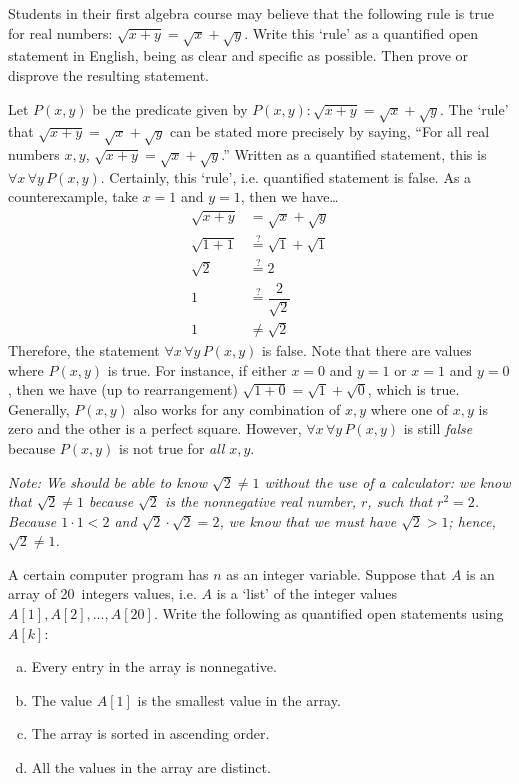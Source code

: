 \documentclass[11pt,letterpaper]{article}
\begin{document}
\newpage



 Students in their first algebra course may believe that the following rule is true for real numbers: $\sqrt{x + y}= \sqrt{x} + \sqrt{y}$. Write this `rule' as a quantified open statement in English, being as clear and specific as possible. Then prove or disprove the resulting statement. \pspace

\sol Let $P(x, y)$ be the predicate given by $P(x, y): \sqrt{x + y}= \sqrt{x} + \sqrt{y}$. The `rule' that $\sqrt{x + y}= \sqrt{x} + \sqrt{y}$ can be stated more precisely by saying, ``For all real numbers $x, y$, $\sqrt{x + y}= \sqrt{x} + \sqrt{y}$.'' Written as a quantified statement, this is $\forall x\, \forall y\, P(x, y)$. Certainly, this `rule', i.e. quantified statement is false. As a counterexample, take $x= 1$ and $y= 1$, then we have\dots
	\[
	\begin{aligned}
	\sqrt{x + y}&= \sqrt{x} + \sqrt{y} \\[0.3cm]
	\sqrt{1 + 1}&\stackrel{?}{=} \sqrt{1} + \sqrt{1} \\[0.3cm]
	\sqrt{2}&\stackrel{?}{=} 2 \\[0.3cm]
	1&\stackrel{?}{=} \dfrac{2}{\sqrt{2}} \\[0.3cm]
	1&\neq \sqrt{2}
	\end{aligned}
	\]
Therefore, the statement $\forall x\, \forall y\, P(x, y)$ is false. Note that there are values where $P(x, y)$ is true. For instance, if either $x= 0$ and $y= 1$ or $x= 1$ and $y= 0$, then we have (up to rearrangement) $\sqrt{1 + 0}= \sqrt{1} + \sqrt{0}$, which is true. Generally, $P(x, y)$ also works for any combination of $x, y$ where one of $x, y$ is zero and the other is a perfect square. However, $\forall x\, \forall y\, P(x, y)$ is still \textit{false} because $P(x, y)$ is not true for \textit{all} $x, y$. \vfill

{\itshape \small Note: We should be able to know $\sqrt{2} \neq 1$ without the use of a calculator: we know that $\sqrt{2} \neq 1$ because $\sqrt{2}$ is the nonnegative real number, $r$, such that $r^2= 2$. Because $1 \cdot 1 < 2$ and $\sqrt{2} \cdot \sqrt{2}= 2$, we know that we must have $\sqrt{2} > 1$; hence, $\sqrt{2} \neq 1$.}



\newpage



 A certain computer program has $n$ as an integer variable. Suppose that $A$ is an array of 20~integers values, i.e. $A$ is a `list' of the integer values $A[1], A[2], \ldots, A[20]$. Write the following as quantified open statements using $A[k]$:
	\begin{enumerate}[(a)]
	\item Every entry in the array is nonnegative.
	\item The value $A[1]$ is the smallest value in the array.
	\item The array is sorted in ascending order. 
	\item All the values in the array are distinct. 
	\end{enumerate} \pspace
\end{document}
